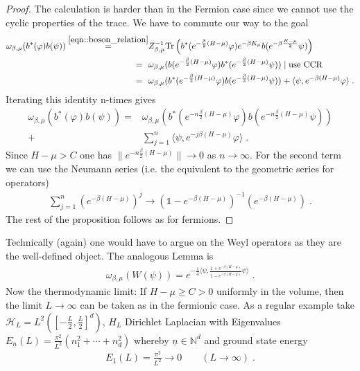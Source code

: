 \documentclass[
a4paper, %
11pt, %
onecolumn, %
openany, %
]{memoir}
\theoremstyle{definition}
\theoremstyle{remark}
\theoremstyle{plain}
\begin{document}
\begin{proof}
	The calculation is harder than in the Fermion case since we cannot use the cyclic properties of the trace. We have to commute our way to the goal \begin{align}
	\omega_{\beta,\mu}(b^*(\varphi)b(\psi))\overset{\eqref{eqn::boson_relation}}{=}&Z_{\beta,\mu}^{-1}\mathrm{Tr}\left(b^*(e^{-\frac{\beta}{2}(H-\mu)}\varphi)e^{-\beta K_{\mu}}b(e^{-\beta \frac{H-\mu}{2}}\psi)\right)\\
	=~~&\omega_{\beta,\mu}(b(e^{-\frac{\beta}{2}(H-\mu)}\varphi)b^*(e^{-\frac{\beta}{2}(H-\mu)}\psi))\mid \text{use CCR}\\
	=~~&\omega_{\beta,\mu}(b^*(e^{-\frac{\beta}{2}(H-\mu)}\varphi)b(e^{-\frac{\beta}{2}(H-\mu)}\psi))+\langle \psi, e^{-\beta (H-\mu)} \varphi\rangle\; .
	\end{align}
	Iterating this identity n-times gives \begin{align}
	\omega_{\beta,\mu}(b^*(\varphi)b(\psi))=&\omega_{\beta,\mu}\left(b^*(e^{-n\frac{\beta}{2}(H-\mu)}\varphi)b(e^{-n\frac{\beta}{2}(H-\mu)}\psi)\right)\\
	+&\sum_{j=1}^{n}\langle \psi, e^{-j\beta(H-\mu)}\varphi\rangle\; .
	\end{align}
	Since $H-\mu > C$ one has $\|e^{-n\frac{\beta}{2}(H-\mu)}\|\rightarrow 0$ as $n\rightarrow\infty$. For the second term we can use the Neumann series (i.e. the equivalent to the geometric series for operators) \begin{align}
	\sum_{j=1}^n\left(e^{-\beta(H-\mu)}\right)^j\rightarrow \left(\mathds{1}-e^{-\beta(H-\mu)}\right)^{-1}\left(e^{-\beta(H-\mu)}\right)\; .
	\end{align}
	The rest of the proposition follows as for fermions. 
	\end{proof}
	Technically (again) one would have to argue on the Weyl operators as they are the well-defined object. The analogous Lemma is \begin{align}
	\omega_{\beta,\mu}(W(\psi))=e^{-\frac{1}{4}\langle\psi, \frac{1+e^{-\beta(H-\mu)}}{1-e^{-\beta(H-\mu)}}\psi\rangle}\; .
	\end{align}
	Now the thermodynamic limit: If $H-\mu\geq C > 0$ uniformly in the volume, then the limit $L\rightarrow \infty$ can be taken as in the fermionic case. As a regular example take $\mathcal{H}_L=L^2\left(\left[-\frac{L}{2},\frac{L}{2}\right]^d\right)$, $H_L$ Dirichlet Laplacian with Eigenvalues $E_{\underline{n}}(L)=\frac{\pi^2}{L^2}(n_1^2+\cdots+n_d^2)$ whereby $\underline{n}\in \mathbb{N}^d$ and ground state energy \begin{align}
	E_{\underline{1}}(L)=\frac{\pi^2}{L^2}\rightarrow 0 \qquad (L\rightarrow \infty)\; .
	\end{align}
\end{document}
